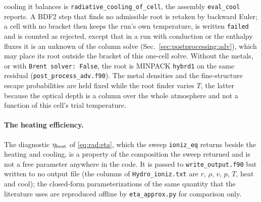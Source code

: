 cooling it balances is \texttt{radiative\_cooling\_of\_cell}, the assembly
\texttt{eval\_cool} reports. A BDF2 step that finds no admissible root is
retaken by backward Euler; a cell with no bracket then keeps the run's own
temperature, is written \texttt{failed} and is counted as rejected, except
that in a run with conduction or the enthalpy fluxes it is an unknown of the
column solve (Sec.~\ref{sec:postprocessing:adv}), which may place its root
outside the bracket of this one-cell solve. Without the metals, or
with \texttt{Brent solver: False}, the root is MINPACK \texttt{hybrd1} on
the same residual (\texttt{post\_process\_adv.f90}). The metal densities and
the fine-structure escape probabilities are held fixed while the root finder
varies $T$, the latter because the optical depth is a column over the whole
atmosphere and not a function of this cell's trial temperature.

\paragraph{The heating efficiency.} The diagnostic $\eta_{\rm heat}$ of
\eqref{eq:rad:eta}, which the sweep \texttt{ioniz\_eq} returns beside the
heating and cooling, is a property of the composition the sweep returned and
is not a free parameter anywhere in the code. It is passed to
\texttt{write\_output.f90} but written to no output file (the columns of
\texttt{Hydro\_ioniz.txt} are $r$, $\rho$, $v$, $p$, $T$, heat and cool); the closed-form
parameterizations of the same quantity that the literature uses are
reproduced offline by \texttt{eta\_approx.py} for comparison only.
